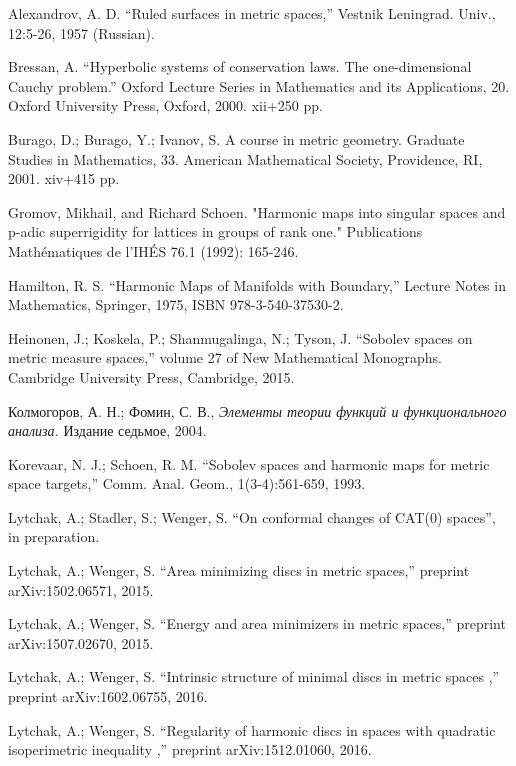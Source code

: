 \documentclass{article}
\begin{document}
\begin{thebibliography}{52}

 Alexandrov, A. D. ``Ruled  surfaces  in  metric  spaces,'' Vestnik Leningrad. Univ., 12:5-26, 1957 (Russian).

 Bressan, A.
``Hyperbolic systems of conservation laws.
The one-dimensional Cauchy problem.'' 
Oxford Lecture Series in Mathematics and its Applications, 20. 
Oxford University Press, Oxford, 2000. 
xii+250 pp.

Burago, D.; Burago, Y.; Ivanov, S.
A course in metric geometry.
Graduate Studies in Mathematics, 33. American Mathematical Society, Providence, RI, 2001. xiv+415 pp.

 Gromov, Mikhail, and Richard Schoen. "Harmonic maps into singular spaces and p-adic superrigidity for lattices in groups of rank one." Publications Mathématiques de l'IHÉS 76.1 (1992): 165-246.

 Hamilton, R. S. ``Harmonic Maps of Manifolds with Boundary,'' Lecture Notes in Mathematics, Springer, 1975, ISBN 978-3-540-37530-2.

 Heinonen, J.;  Koskela, P.;  Shanmugalinga, N.; Tyson, J. ``Sobolev spaces on metric measure spaces,''
volume 27 of New Mathematical Monographs. Cambridge University Press, Cambridge, 2015.

\begin{otherlanguage}{russian}
Колмогоров, А. Н.;
Фомин, С. В.,
\textit{Элементы теории функций и функционального анализа.}
Издание седьмое, 2004.
\end{otherlanguage}

Korevaar, N. J.; Schoen, R. M. ``Sobolev spaces and harmonic maps for metric space targets,'' Comm. Anal. Geom., 1(3-4):561-659, 1993.

 Lytchak, A.; Stadler, S.; Wenger, S.  ``On conformal changes of CAT(0) spaces'', in preparation.

Lytchak, A.; Wenger, S. ``Area minimizing discs in metric spaces,'' preprint arXiv:1502.06571, 2015.

Lytchak, A.; Wenger, S. ``Energy and area minimizers in metric spaces,'' preprint  arXiv:1507.02670, 2015.

Lytchak, A.; Wenger, S. ``Intrinsic structure of minimal discs in metric spaces ,'' preprint  arXiv:1602.06755, 2016.

Lytchak, A.; Wenger, S. ``Regularity of harmonic discs in spaces with quadratic isoperimetric inequality  ,'' preprint  arXiv:1512.01060, 2016.


\end{thebibliography}
\end{document}
